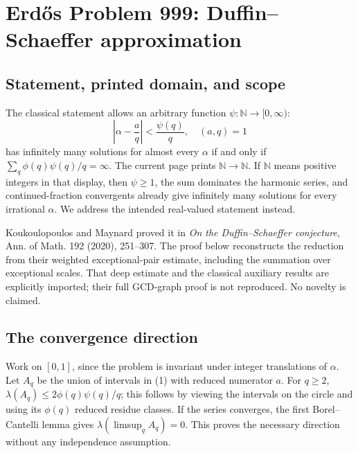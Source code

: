 \section*{Erd\H{o}s Problem 999: Duffin--Schaeffer approximation}
\subsection*{Statement, printed domain, and scope}
The classical statement allows an arbitrary function $\psi:\mathbb N\to[0,\infty)$:
\[
 \left|\alpha-\frac aq\right|<\frac{\psi(q)}q,\quad (a,q)=1
 \tag{1}
\]
has infinitely many solutions for almost every $\alpha$ if and only if
$\sum_q\phi(q)\psi(q)/q=\infty$.
The current page prints $\mathbb N\to\mathbb N$. If $\mathbb N$ means positive integers in that display, then $\psi\ge1$, the sum dominates the harmonic series, and continued-fraction convergents already give infinitely many solutions for every irrational $\alpha$. We address the intended real-valued statement instead.

Koukoulopoulos and Maynard proved it in \emph{On the Duffin--Schaeffer conjecture}, Ann. of Math. 192 (2020), 251--307.
The proof below reconstructs the reduction from their weighted exceptional-pair estimate, including the summation over exceptional scales. That deep estimate and the classical auxiliary results are explicitly imported; their full GCD-graph proof is not reproduced. No novelty is claimed.

\subsection*{The convergence direction}
Work on $[0,1]$, since the problem is invariant under integer translations of $\alpha$.
Let $A_q$ be the union of intervals in (1) with reduced numerator $a$.
For $q\ge2$, $\lambda(A_q)\le2\phi(q)\psi(q)/q$; this follows by viewing the intervals on the circle and using its $\phi(q)$ reduced residue classes.
If the series converges, the first Borel--Cantelli lemma gives
$\lambda(\limsup_q A_q)=0$. This proves the necessary direction without any independence assumption.

